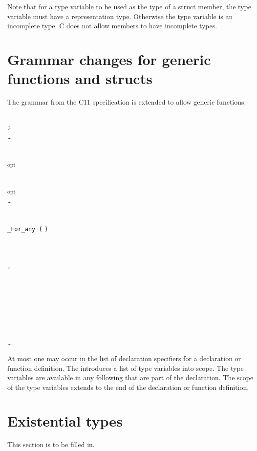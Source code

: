 Note that for a type variable to be used as the type of a struct member, 
the type variable must have a representation type.   Otherwise the type
variable is an incomplete type.  C does not allow members to have incomplete
types.

\section{Grammar changes for generic functions and structs}

The grammar from the C11 specification \cite{ISO2011} is extended to allow
generic functions:
\begin{tabbing}
\=\\
\>  \texttt{;} \\
\>\ldots{} \\
\\
\\
\>   
  \textsubscript{opt} \\
\\
\\
\> \textsubscript{opt} \\
\>\ldots{} \\
\\
\\
\>\texttt{\_For\_any (}  \texttt{)} \\
\\
 \\
\> \\
\> \texttt{,} \\
\\
 \\
\> \\
\\
\\
 \\
\> \\
\>\ldots{} \\
\end{tabbing}
At most one  may occur in the list of declaration specifiers
for a declaration or function definition.
The  introduces a list of type variables into scope.  
The type variables are available in any following  that are part
of the declaration.  The scope of the type variables extends to the end of
the declaration or function definition.

\section{Existential types}
This section is to be filled in.

